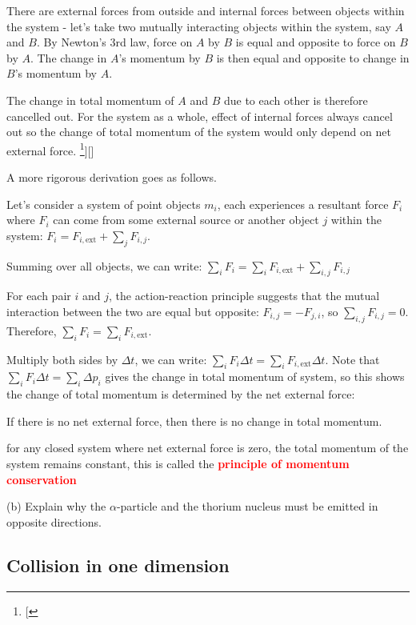 \documentclass[a4paper,12pt]{book}
\newenvironment{ilight}
  {\centering
  	\vspace*{6pt}
  	\begin{tcolorbox}[colframe=Gray,colback=LightGrey!15]
  \setlength{\baselineskip}{\baselineskip}%
  }
  {\end{tcolorbox}\vspace*{-4pt}}
\newcommand{\keypoint}[1]{\textbf{\textcolor{red}{#1}}}
\newcommand{\sidenote}[1]{\footnote{#1}}
\newcommand{\tcbhighmath}[1]{\boxed{#1}}
\newcommand{\keypoint}[1]{\textbf{\textcolor{red}{#1}}}
\begin{document}
There are external forces from outside and internal forces between objects within the system - let's take two mutually interacting objects within the system, say $A$ and $B$. By Newton's 3rd law, force on $A$ by $B$ is equal and opposite to force on $B$ by $A$.
The change in $A$'s momentum by $B$ is then equal and opposite to change in $B$'s momentum by $A$. 

The change in total momentum of $A$ and $B$ due to each other is therefore cancelled out. For the system as a whole, effect of internal forces always cancel out so the change of total momentum of the system would only depend on net external force. \sidenote[][]{A more rigorous derivation goes as follows.
	
	Let's consider a system of point objects $m_i$, each experiences a resultant force $F_i$ where $F_i$ can come from some external source or another object $j$ within the system: $F_i = F_{i,\text{ext}} + \sum_j F_{i,j}$.
	
	Summing over all objects, we can write: $\sum_i F_i = \sum_i F_{i,\text{ext}} + \sum_{i,j} F_{i,j}$ 
	
	For each pair $i$ and $j$, the action-reaction principle suggests that the mutual interaction between the two are equal but opposite: $F_{i,j} = -F_{j,i}$, so $\sum_{i,j} F_{i,j} = 0$. Therefore, $\sum_i F_i = \sum_i F_{i,\text{ext}}$.
	
	Multiply both sides by $\Delta t$, we can write: $\sum_i F_i \Delta t = \sum_i F_{i,\text{ext}} \Delta t$. Note that $\sum_i F_i \Delta t = \sum_i \Delta p_i$ gives the change in total momentum of system, so this shows the change of total momentum is determined by the net external force: \begin{empheq}[box=\tcbhighmath]{equation*}{\left(\sum_i F_{i,\text{ext}} \right)\Delta t = \sum_i \Delta p_i}\end{empheq}}

If there is no net external force, then there is no change in total momentum.

\begin{ilight}
	for any closed system where net external force is zero, the total momentum of the system remains constant, this is called the \keypoint{principle of momentum conservation} 
\end{ilight}

 (b) Explain why the $\alpha$-particle and the thorium nucleus must be emitted in opposite directions.

\subsection{Collision in one dimension}
\end{document}
